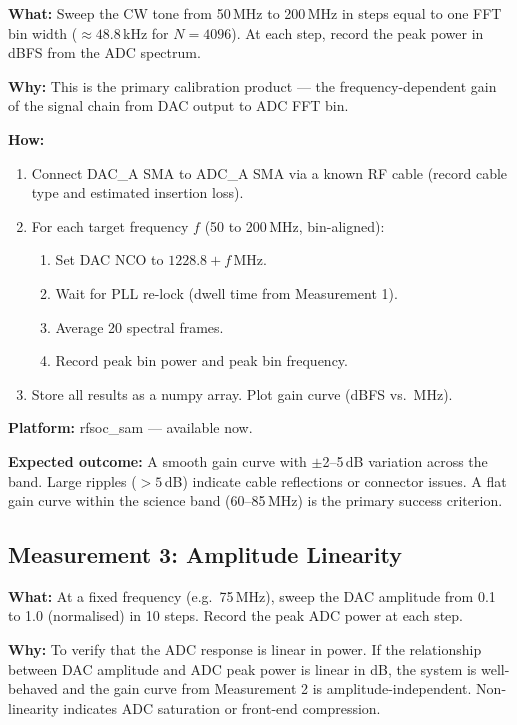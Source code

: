 \documentclass[11pt,a4paper]{article}
\begin{document}
\textbf{What:} Sweep the CW tone from 50\,MHz to 200\,MHz in steps equal to one
FFT bin width ($\approx 48.8$\,kHz for $N = 4096$). At each step, record the
peak power in dBFS from the ADC spectrum.

\textbf{Why:} This is the primary calibration product --- the frequency-dependent
gain of the signal chain from DAC output to ADC FFT bin.

\textbf{How:}
\begin{enumerate}[leftmargin=2em,itemsep=2pt]
  \item Connect DAC\_A SMA to ADC\_A SMA via a known RF cable (record cable type
        and estimated insertion loss).
  \item For each target frequency $f$ (50 to 200\,MHz, bin-aligned):
        \begin{enumerate}[leftmargin=2em]
          \item Set DAC NCO to $1228.8 + f$\,MHz.
          \item Wait for PLL re-lock (dwell time from Measurement 1).
          \item Average 20 spectral frames.
          \item Record peak bin power and peak bin frequency.
        \end{enumerate}
  \item Store all results as a numpy array. Plot gain curve (dBFS vs.\ MHz).
\end{enumerate}

\textbf{Platform:} rfsoc\_sam --- available now.

\textbf{Expected outcome:} A smooth gain curve with $\pm$2--5\,dB variation across
the band. Large ripples ($> 5$\,dB) indicate cable reflections or connector issues.
A flat gain curve within the science band (60--85\,MHz) is the primary success
criterion.

\subsection{Measurement 3: Amplitude Linearity}
\label{sec:m3}

\textbf{What:} At a fixed frequency (e.g.\ 75\,MHz), sweep the DAC amplitude
from 0.1 to 1.0 (normalised) in 10 steps. Record the peak ADC power at each step.

\textbf{Why:} To verify that the ADC response is linear in power. If the relationship
between DAC amplitude and ADC peak power is linear in dB, the system is well-behaved
and the gain curve from Measurement 2 is amplitude-independent. Non-linearity
indicates ADC saturation or front-end compression.
\end{document}

